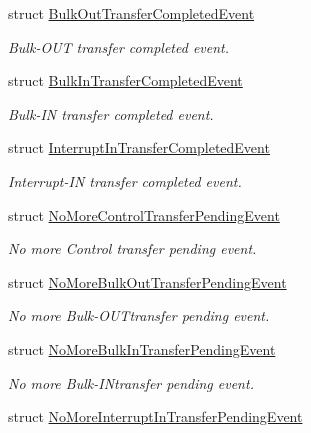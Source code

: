\begin{DoxyCompactItemize}
struct \hyperlink{structmdt_usbtmc_transfer_handler_state_machine_1_1_bulk_out_transfer_completed_event}{Bulk\-Out\-Transfer\-Completed\-Event}
\begin{DoxyCompactList}\small\item\em Bulk-\/\-O\-U\-T transfer completed event. \end{DoxyCompactList}\item 
struct \hyperlink{structmdt_usbtmc_transfer_handler_state_machine_1_1_bulk_in_transfer_completed_event}{Bulk\-In\-Transfer\-Completed\-Event}
\begin{DoxyCompactList}\small\item\em Bulk-\/\-I\-N transfer completed event. \end{DoxyCompactList}\item 
struct \hyperlink{structmdt_usbtmc_transfer_handler_state_machine_1_1_interrupt_in_transfer_completed_event}{Interrupt\-In\-Transfer\-Completed\-Event}
\begin{DoxyCompactList}\small\item\em Interrupt-\/\-I\-N transfer completed event. \end{DoxyCompactList}\item 
struct \hyperlink{structmdt_usbtmc_transfer_handler_state_machine_1_1_no_more_control_transfer_pending_event}{No\-More\-Control\-Transfer\-Pending\-Event}
\begin{DoxyCompactList}\small\item\em No more Control transfer pending event. \end{DoxyCompactList}\item 
struct \hyperlink{structmdt_usbtmc_transfer_handler_state_machine_1_1_no_more_bulk_out_transfer_pending_event}{No\-More\-Bulk\-Out\-Transfer\-Pending\-Event}
\begin{DoxyCompactList}\small\item\em No more Bulk-\/\-O\-U\-Ttransfer pending event. \end{DoxyCompactList}\item 
struct \hyperlink{structmdt_usbtmc_transfer_handler_state_machine_1_1_no_more_bulk_in_transfer_pending_event}{No\-More\-Bulk\-In\-Transfer\-Pending\-Event}
\begin{DoxyCompactList}\small\item\em No more Bulk-\/\-I\-Ntransfer pending event. \end{DoxyCompactList}\item 
struct \hyperlink{structmdt_usbtmc_transfer_handler_state_machine_1_1_no_more_interrupt_in_transfer_pending_event}{No\-More\-Interrupt\-In\-Transfer\-Pending\-Event}

\end{DoxyCompactItemize}
